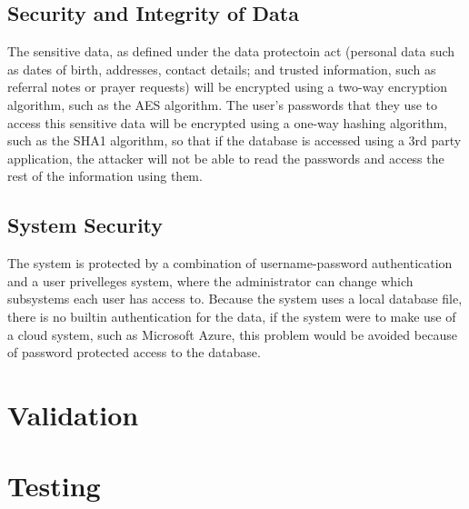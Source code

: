 \subsection{Security and Integrity of Data}
	The sensitive data, as defined under the data protectoin act (personal data such as dates of birth, addresses, contact details; and
	trusted information, such as referral notes or prayer requests) will be encrypted using a two-way encryption algorithm, such as the
	AES algorithm.
	The user's passwords that they use to access this sensitive data will be encrypted using a one-way hashing algorithm, such as the SHA1
	algorithm, so that if the database is accessed using a 3rd party application, the attacker will not be able to read the passwords and
	access the rest of the information using them.


\subsection{System Security}
	The system is protected by a combination of username-password authentication and a user privelleges system, where the administrator can
	change which subsystems each user has access to. Because the system uses a local database file, there is no builtin authentication for
	the data, if the system were to make use of a cloud system, such as Microsoft Azure, this problem would be avoided because of password
	protected  access to the database.

\section{Validation}

\section{Testing}

